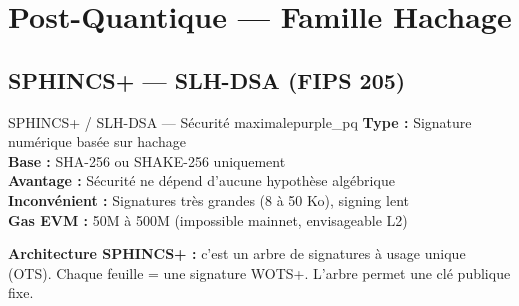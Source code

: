 \documentclass[12pt, a4paper]{article}
\begin{document}
\section{Post-Quantique --- Famille Hachage}

\subsection{SPHINCS+ --- SLH-DSA (FIPS 205)}

\begin{algobox}{SPHINCS+ / SLH-DSA --- Sécurité maximale}{purple_pq}
\textbf{Type :} Signature numérique basée sur hachage\\
\textbf{Base :} SHA-256 ou SHAKE-256 uniquement\\
\textbf{Avantage :} Sécurité ne dépend d'aucune hypothèse algébrique\\
\textbf{Inconvénient :} Signatures très grandes (8 à 50 Ko), signing lent\\
\textbf{Gas EVM :} 50M à 500M (impossible mainnet, envisageable L2)
\end{algobox}

\textbf{Architecture SPHINCS+ :} c'est un arbre de signatures à usage unique (OTS).
Chaque feuille = une signature WOTS+. L'arbre permet une clé publique fixe.

\begin{center}
\end{center}
\end{document}
